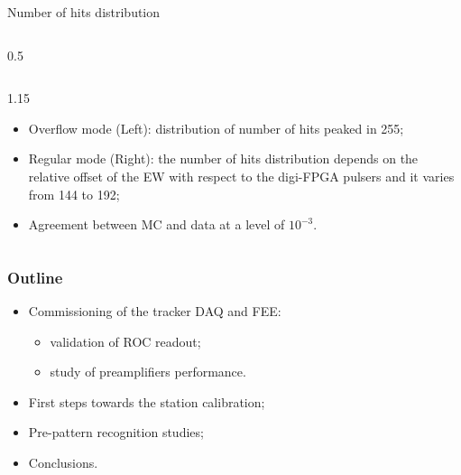 \documentclass{beamer}
\begin{document}
\begin{frame}{Number of hits distribution}
\begin{columns}
\begin{column}{0.5\framewidth}
\begin{figure}[H]
          \label{fig:un} 
          \end{figure} 
    \end{column}
\end{columns}
 \vspace{-3mm}
 \begin{columns}
    \begin{column}{1.15\framewidth}
     \begin{itemize}
        \item Overflow mode (Left): distribution of number of hits peaked in 255; 
        \item Regular mode (Right): the number of hits  distribution depends on the relative offset of the EW  with respect to the digi-FPGA pulsers and it varies from 
144 to 192;
            \item Agreement between MC and data at a level of $10^{-3}$.

    \end{itemize}  
    \end{column}
    \end{columns}
\end{frame}





\begin{frame}
    \frametitle{Outline}
    
\begin{itemize}
\item Commissioning of the tracker DAQ and FEE:
\begin{itemize}
         \vspace{2mm}

    \item \textcolor{mygray}{validation of ROC readout;}
             \vspace{1.5mm}

    \item study of preamplifiers performance.
\end{itemize}
\vspace{4mm}
    \item \textcolor{mygray}{First steps towards the station calibration;}
    \vspace{6mm}

    \item \textcolor{mygray}{Pre-pattern recognition studies;}
    \vspace{6mm}

    \item \textcolor{mygray}{Conclusions.}
\end{itemize}
\end{frame}
\end{document}
